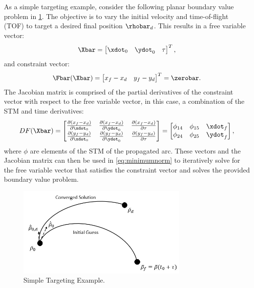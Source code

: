 As a simple targeting example, consider the following planar boundary value problem in
\cref{fig:targeting}. The objective is to vary the initial velocity and time-of-flight (TOF) to
target a desired final position $\rhobar_{d}$. This results in a free variable vector:
\begin{equation}
    \Xbar=\begin{bmatrix}   \xdot_{0}   &   \ydot_{0}   &   \tau    \end{bmatrix}^{T},
    \label{eq:exfreevar}
\end{equation}
and constraint vector:
\begin{equation}
    \Fbar(\Xbar)=\begin{bmatrix}    x_{f}-x_{d} &   y_{f}-y_{d} \end{bmatrix}^{T}=\zerobar.
    \label{eq:exconst}
\end{equation}
The Jacobian matrix is comprised of the partial derivatives of the constraint vector with respect
to the free variable vector, in this case, a combination of the STM and time derivatives:
\begin{equation}
    DF(\Xbar)=\begin{bmatrix}   \frac{\partial(x_{f}-x_{d})}{\partial\xdot_{0}} &   \frac{\partial(x_{f}-x_{d})}{\partial\ydot_{0}} &   \frac{\partial(x_{f}-x_{d})}{\partial\tau}  \\
                                \frac{\partial(y_{f}-y_{d})}{\partial\xdot_{0}} &   \frac{\partial(y_{f}-y_{d})}{\partial\ydot_{0}} &   \frac{\partial(y_{f}-y_{d})}{\partial\tau}  \end{bmatrix}
             =\begin{bmatrix}   \phi_{14}                                       &   \phi_{15}                                       &   \xdot_{f}                                   \\
                                \phi_{24}                                       &   \phi_{25}                                       &   \ydot_{f}                                   \end{bmatrix},
    \label{eq:exJacobian}
\end{equation}
where $\phi$ are elements of the STM of the propagated arc. These vectors and the Jacobian matrix
can then be used in \cref{eq:minimumnorm} to iteratively solve for the free variable vector that
satisfies the constraint vector and solves the provided boundary value problem.

\begin{figure}[ht]
    \centering
    \includegraphics[width=0.75\textwidth]{figures/Targeting.jpg}
    \caption{Simple Targeting Example.}
    \label{fig:targeting}
\end{figure}

